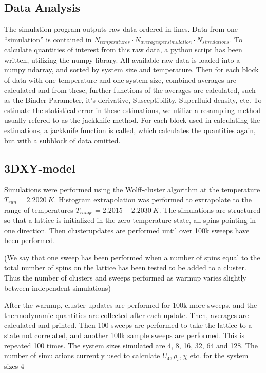 \subsection{Data Analysis}
The simulation program outputs raw data ordered in lines. Data from one ``simulation'' is contained in $N_{temperatures} \cdot N_{averages per simulation} \cdot N_{simulations}$.
To calculate quantities of interest from this raw data, a python script has been written, utilizing the numpy library. All available raw data is loaded into a numpy ndarray, and sorted by system size and temperature. Then for each block of data with one temperature and one system size, combined averages are calculated and from these, further functions of the averages are calculated, such as the Binder Parameter, it's derivative, Susceptibility, Superfluid density, etc. To estimate the statistical error in these estimations, we utilize a resampling method usually refered to as the jackknife method. For each block used in calculating the estimations, a jackknife function is called, which calculates the quantities again, but with a subblock of data omitted.
\subsection{3DXY-model}
Simulations were performed using the Wolff-cluster algorithm at the temperature $T_{run} = 2.2020~K$. Histogram extrapolation was performed to extrapolate to the range of temperatures $T_{range} = 2.2015-2.2030 ~ K$.
The simulations are structured so that a lattice is initialized in the zero temperature state, all spins pointing in one direction. Then clusterupdates are performed until over 100k sweeps have been performed.

(We say that one sweep has been performed when a number of spins equal to the total number of spins on the lattice has been tested to be added to a cluster.
Thus the number of clusters and sweeps performed as warmup varies slightly between independent simulations)

After the warmup, cluster updates are performed for 100k more sweeps, and the thermodynamic quantities are collected after each update. Then, averages are calculated and printed. Then 100 sweeps are performed to take the lattice to a state not correlated, and another 100k sample sweeps are performed. This is repeated 100 times. The system sizes simulated are 4, 8, 16, 32, 64 and 128. 
The number of simulations currently used to calculate $U_4, \rho_s, \chi $ etc. for the system sizes 4


